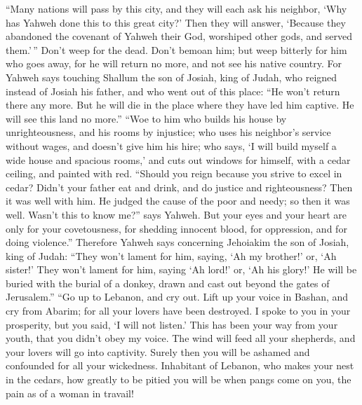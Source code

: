  ``Many nations will pass by this city, and they will each
ask his neighbor, `Why has Yahweh done this to this great city?'
 Then they will answer, `Because they abandoned the
covenant of Yahweh their God, worshiped other gods, and served
them.'\,''  Don't weep for the dead. Don't bemoan him;
but weep bitterly for him who goes away, for he will return no more, and
not see his native country.  For Yahweh says touching
Shallum the son of Josiah, king of Judah, who reigned instead of Josiah
his father, and who went out of this place: ``He won't return there any
more.  But he will die in the place where they have led
him captive. He will see this land no more.''  ``Woe to
him who builds his house by unrighteousness, and his rooms by injustice;
who uses his neighbor's service without wages, and doesn't give him his
hire;  who says, `I will build myself a wide house and
spacious rooms,' and cuts out windows for himself, with a cedar ceiling,
and painted with red.  ``Should you reign because you
strive to excel in cedar? Didn't your father eat and drink, and do
justice and righteousness? Then it was well with him.  He
judged the cause of the poor and needy; so then it was well. Wasn't this
to know me?'' says Yahweh.  But your eyes and your heart
are only for your covetousness, for shedding innocent blood, for
oppression, and for doing violence.''  Therefore Yahweh
says concerning Jehoiakim the son of Josiah, king of Judah: ``They won't
lament for him, saying, `Ah my brother!' or, `Ah sister!' They won't
lament for him, saying `Ah lord!' or, `Ah his glory!'  He
will be buried with the burial of a donkey, drawn and cast out beyond
the gates of Jerusalem.''  ``Go up to Lebanon, and cry
out. Lift up your voice in Bashan, and cry from Abarim; for all your
lovers have been destroyed.  I spoke to you in your
prosperity, but you said, `I will not listen.' This has been your way
from your youth, that you didn't obey my voice.  The wind
will feed all your shepherds, and your lovers will go into captivity.
Surely then you will be ashamed and confounded for all your wickedness.
 Inhabitant of Lebanon, who makes your nest in the
cedars, how greatly to be pitied you will be when pangs come on you, the
pain as of a woman in travail!

